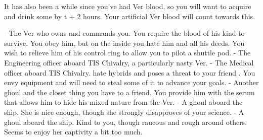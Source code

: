 \documentclass[char]{guildcamp4}
\begin{document}
\begin{itemz}[Notes]
	\item It has also been a while since you've had Ver blood, so you will want to acquire and drink some by t + 2 hours. Your artificial Ver blood will count towards this.
\end{itemz}

\begin{contacts}
	\contact{\cVone{}} - The Ver who owns and commands you. You require the blood of his kind to survive. You obey him, but on the inside you hate him and all his deeds. You wish to relieve him of his control ring to allow you to pilot a shuttle pod.
	\contact{\cVtwo{}} - The Engineering officer aboard TIS Chivalry, a particularly nasty Ver.
	\contact{\cVthree{}} - The Medical officer aboard TIS Chivalry. \cVthree{\They} hate hybrids and poses a threat to your friend \cRasputin{}. You envy \cVthree{\their} equipment and will need to steal some of it to advance your goals.
	\contact{\cRasputin{}} - Another ghoul and the closet thing you have to a friend. You provide him with the serum that allows him to hide his mixed nature from the Ver. 
	\contact{\cJoan{}} - A ghoul aboard the ship. She is nice enough, though she strongly disapproves of your science.  
	\contact{\cJulie{}} - A ghoul aboard the ship. Kind to you, though raucous and rough around others. Seems to enjoy her captivity a bit too much. 
\end{contacts}
\end{document}
